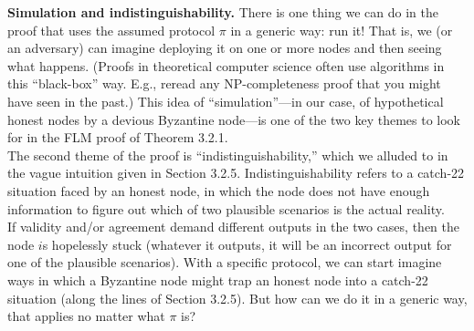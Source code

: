 \noindent
\textbf{Simulation and indistinguishability.} There is one thing we can do in the proof that
uses the assumed protocol $\pi$ in a generic way: run it! That is, we (or an adversary) can
imagine deploying it on one or more nodes and then seeing what happens. (Proofs in
theoretical computer science often use algorithms in this “black-box” way. E.g., reread any
NP-completeness proof that you might have seen in the past.) This idea of “simulation”—in
our case, of hypothetical honest nodes by a devious Byzantine node—is one of the two key
themes to look for in the FLM proof of Theorem 3.2.1.\\
The second theme of the proof is “indistinguishability,” which we alluded to in the vague
intuition given in Section 3.2.5. Indistinguishability refers to a catch-22 situation faced by an
honest node, in which the node does not have enough information to figure out which of
two plausible scenarios is the actual reality.
\\
If validity and/or agreement demand different
outputs in the two cases, then the node $i$s hopelessly stuck (whatever it outputs, it will be
an incorrect output for one of the plausible scenarios).
With a specific protocol, we can start imagine ways in which a Byzantine node might
trap an honest node into a catch-22 situation (along the lines of Section 3.2.5). But how can
we do it in a generic way, that applies no matter what $\pi$ is?

